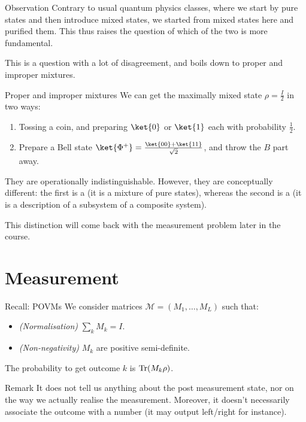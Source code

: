 \documentclass[a4paper]{article}
\begin{document}
\begin{parag}{Observation}
    Contrary to usual quantum physics classes, where we start by pure states and then introduce mixed states, we started from mixed states here and purified them. This thus raises the question of which of the two is more fundamental. 

    This is a question with a lot of disagreement, and boils down to proper and improper mixtures.
\end{parag}

\begin{parag}{Proper and improper mixtures}
    We can get the maximally mixed state $\rho = \frac{I}{2}$ in two ways:
    \begin{enumerate}
        \item Tossing a coin, and preparing $\ket{0}$ or $\ket{1}$ each with probability $\frac{1}{2}$.
        \item Prepare a Bell state $\ket{\Phi^+} = \frac{\ket{00} + \ket{11}}{\sqrt{2}}$, and throw the $B$ part away.
    \end{enumerate}

    They are operationally indistinguishable. However, they are conceptually different: the first is a  (it is a mixture of pure states), whereas the second is a  (it is a description of a subsystem of a composite system).

    This distinction will come back with the measurement problem later in the course.
\end{parag}

\section{Measurement}

\begin{parag}{Recall: POVMs}
    We consider matrices $\mathcal{M} = \left(M_1, \ldots, M_L\right)$ such that: 
    \begin{itemize}
        \item \textit{(Normalisation)} $\sum_{k} M_k = I$.
        \item \textit{(Non-negativity)} $M_k$ are positive semi-definite.
    \end{itemize}

    The probability to get outcome $k$ is $\Tr\left(M_k \rho\right)$.

    \begin{subparag}{Remark}
        It does not tell us anything about the post measurement state, nor on the way we actually realise the measurement. Moreover, it doesn't necessarily associate the outcome with a number (it may output left/right for instance).
    \end{subparag}
\end{parag}
\end{document}
